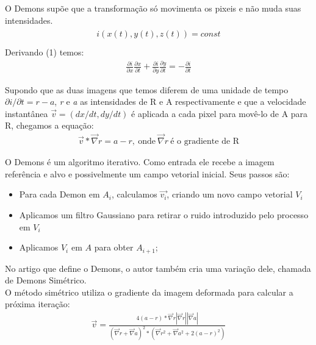 \documentclass[t]{beamer}
\begin{document}
\begin{frame}
  O Demons supõe que a transformação só movimenta os pixeis e não muda suas intensidades.
  \begin{align}
    \begin{split}
    i(x(t),y(t),z(t)) = const \\
    \end{split}
  \end{align}
  Derivando (1) temos:
  \begin{align}
    \frac{\partial i}{\partial x} \frac{\partial x}{\partial t} +
    \frac{\partial i}{\partial y} \frac{\partial y}{\partial t} = - \frac{\partial i}{\partial t}
\end{align}
\end{frame}

\begin{frame}
        Supondo que as duas imagens que temos diferem de uma unidade de tempo $\partial i/\partial t = 
r-a$, \textit{r} e \textit{a} as intensidades de R e A respectivamente e que a velocidade instantânea 
$\vec{v} = (dx/dt,dy/dt)$ é aplicada a cada pixel para movê-lo de A para R, chegamos a equação:
\begin{align}
    \vec{v}*\vec{\nabla}r = a - r, \ \text{onde} \ \vec{\nabla} r \ \text{é o gradiente de R}
\end{align}
\end{frame}

\begin{frame}
    O Demons é um algoritmo iterativo. Como entrada ele recebe a imagem referência e alvo e possivelmente um campo
vetorial inicial. Seus passos são:
\begin{itemize}
    \item Para cada Demon em $A_i$, calculamos $\vec{v_i}$, criando um novo campo vetorial $V_i$
    \item Aplicamos um filtro Gaussiano para retirar o ruido introduzido pelo processo em $V_i$
    \item Aplicamos $V_i$ em $A$ para obter $A_{i+1}$;
\end{itemize}
\end{frame}

\begin{frame}
    No artigo que define o Demons, o autor também cria uma variação dele, chamada de Demons Simétrico. \\
O método simétrico utiliza o gradiente da imagem deformada para calcular a próxima iteração:
\begin{align}
    \vec{v} = \frac{4(a - r)*\vec{\nabla}r|\vec{\nabla}r||\vec{\nabla}a|}
                    {(\vec{\nabla}r+\vec{\nabla}a)^2*(\vec{\nabla}r^2 + \vec{\nabla}a^2 + 2(a - r)^2)}
\end{align} 
\end{frame}
\end{document}
